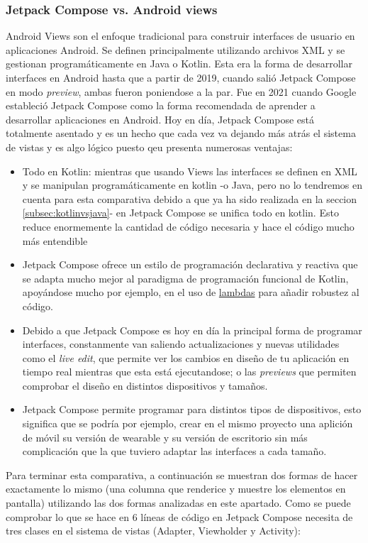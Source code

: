 \subsubsection{Jetpack Compose vs. Android views}
Android Views son el enfoque tradicional para construir interfaces de usuario en aplicaciones Android. Se definen principalmente utilizando archivos XML y se gestionan programáticamente en Java o Kotlin. Esta era la forma de desarrollar interfaces en Android hasta que a partir de 2019, cuando salió Jetpack Compose en modo \textit{preview}, ambas fueron poniendose a la par. Fue en 2021 cuando Google estableció Jetpack Compose como la forma recomendada de aprender a desarrollar aplicaciones en Android. Hoy en día, Jetpack Compose está totalmente asentado y es un hecho que cada vez va dejando más atrás el sistema de vistas y es algo lógico puesto qeu presenta numerosas ventajas:
\begin{itemize}
    \item Todo en Kotlin: mientras que usando Views las interfaces se definen en XML y se manipulan programáticamente en kotlin -o Java, pero no lo tendremos en cuenta para esta comparativa debido a que ya ha sido realizada en la seccion \ref*{subsec:kotlinvsjava}- en Jetpack Compose se unifica todo en kotlin. Esto reduce enormemente la cantidad de código necesaria y hace el código mucho más entendible
    \item Jetpack Compose ofrece un estilo de programación declarativa y reactiva que se adapta mucho mejor al paradigma de programación funcional de Kotlin, apoyándose mucho por ejemplo, en el uso de \href{https://kotlinlang.org/docs/lambdas.html}{lambdas} para añadir robustez al código.
    \item Debido a que Jetpack Compose es hoy en día la principal forma de programar interfaces, constanmente van saliendo actualizaciones y nuevas utilidades como el \textit{live edit}, que permite ver los cambios en diseño de tu aplicación en tiempo real mientras que esta está ejecutandose; o las \textit{previews} que permiten comprobar el diseño en distintos dispositivos y tamaños.
    \item Jetpack Compose permite programar para distintos tipos de dispositivos, esto significa que se podría por ejemplo, crear en el mismo proyecto una aplición de móvil su versión de wearable y su versión de escritorio sin más complicación que la que tuviero adaptar las interfaces a cada tamaño.
\end{itemize}
Para terminar esta comparativa, a continuación se muestran dos formas de hacer exactamente lo mismo (una columna que renderice y muestre los elementos en pantalla) utilizando las dos formas analizadas en este apartado. Como se puede comprobar lo que se hace en 6 líneas de código en Jetpack Compose necesita de tres clases en el sistema de vistas (Adapter, Viewholder y Activity):
